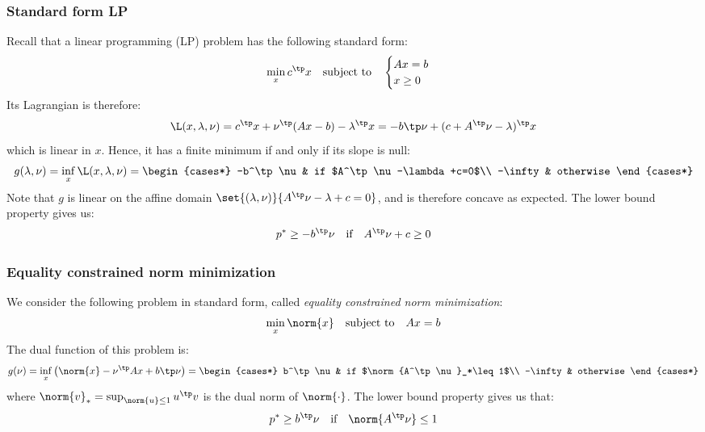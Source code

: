 \subsubsection{Standard form LP}
Recall that a linear programming (LP) problem has the following standard form:
\begin{equation*}
    \min_x c^\tp x \quad\text{subject to}\quad \begin{cases}
        Ax=b\\
        x\geq0
    \end{cases}
\end{equation*}
Its Lagrangian is therefore:
\begin{equation*}
    \L(x, \lambda,\nu) = c^\tp x + \nu^\tp(Ax-b)-\lambda^\tp x = -b\tp\nu + (c+A^\tp\nu-\lambda)^\tp x
\end{equation*}
which is linear in $x$. Hence, it has a finite minimum if and only if its slope is null:
\begin{equation*}
    g(\lambda,\nu)=\inf_x\L(x,\lambda,\nu) = \begin{cases*}
        -b^\tp\nu & if $A^\tp\nu-\lambda+c=0$\\
        -\infty & otherwise
    \end{cases*}
\end{equation*}
Note that $g$ is linear on the affine domain $\set{(\lambda,\nu)}{A^\tp\nu-\lambda+c=0}$, and is therefore concave as expected. The lower bound property gives us:
\begin{equation*}
    p^*\geq-b^\tp\nu \quad\text{if}\quad A^\tp\nu+c\geq0
\end{equation*}

\subsubsection{Equality constrained norm minimization}
We consider the following problem in standard form, called \emph{equality constrained norm minimization}:
\begin{equation*}
    \min_x \norm{x} \quad\text{subject to}\quad Ax=b
\end{equation*}
The dual function of this problem is:
\begin{equation*}
    g(\nu)=\inf_x\left(\norm{x}-\nu^\tp Ax+b\tp\nu\right) = \begin{cases*}
        b^\tp\nu & if $\norm{A^\tp\nu}_*\leq1$\\
        -\infty & otherwise
    \end{cases*}
\end{equation*}
where $\norm{v}_*=\sup_{\norm{u}\leq1}u^\tp v$ is the dual norm of $\norm{\cdot}$. The lower bound property gives us that:
\begin{equation*}
    p^* \geq b^\tp\nu \quad\text{if}\quad \norm{A^\tp\nu}\leq1
\end{equation*}

